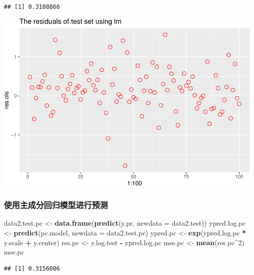 \documentclass[]{article}
\newenvironment{Shaded}{\begin{snugshade}}{\end{snugshade}}
\newcommand{\KeywordTok}[1]{\textcolor[rgb]{0.13,0.29,0.53}{\textbf{#1}}}
\newcommand{\DataTypeTok}[1]{\textcolor[rgb]{0.13,0.29,0.53}{#1}}
\newcommand{\DecValTok}[1]{\textcolor[rgb]{0.00,0.00,0.81}{#1}}
\newcommand{\StringTok}[1]{\textcolor[rgb]{0.31,0.60,0.02}{#1}}
\newcommand{\OperatorTok}[1]{\textcolor[rgb]{0.81,0.36,0.00}{\textbf{#1}}}
\newcommand{\NormalTok}[1]{#1}
\begin{document}
\begin{verbatim}
## [1] 0.3108866
\end{verbatim}

\includegraphics{FinalProjectForRegressionAnalysis_files/figure-latex/unnamed-chunk-36-1.pdf}

\subsubsection{使用主成分回归模型进行预测}

\begin{Shaded}
\begin{Highlighting}[]
\NormalTok{data2.test.pc <-}\StringTok{ }\KeywordTok{data.frame}\NormalTok{(}\KeywordTok{predict}\NormalTok{(y.pr, }\DataTypeTok{newdata =}\NormalTok{ data2.test))}
\NormalTok{ypred.log.pc <-}\StringTok{ }\KeywordTok{predict}\NormalTok{(pc.model, }\DataTypeTok{newdata =}\NormalTok{ data2.test.pc)}
\NormalTok{ypred.pc <-}\StringTok{ }\KeywordTok{exp}\NormalTok{(ypred.log.pc }\OperatorTok{*}\StringTok{ }\NormalTok{y.scale }\OperatorTok{+}\StringTok{ }\NormalTok{y.center)}
\NormalTok{res.pc <-}\StringTok{ }\NormalTok{y.log.test }\OperatorTok{-}\StringTok{ }\NormalTok{ypred.log.pc}
\NormalTok{mse.pc <-}\StringTok{ }\KeywordTok{mean}\NormalTok{(res.pc}\OperatorTok{^}\DecValTok{2}\NormalTok{)}
\NormalTok{mse.pc}
\end{Highlighting}
\end{Shaded}

\begin{verbatim}
## [1] 0.3156006
\end{verbatim}
\end{document}
